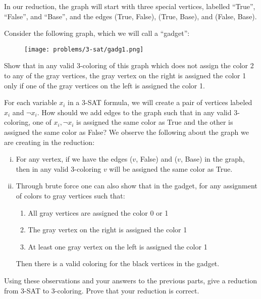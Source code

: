 \documentclass{article}
\begin{document}
In our reduction, the graph will start with three special vertices, labelled ``True'', ``False'', and ``Base'', and the edges (True, False), (True, Base), and (False, Base).
\begin{subparts}

\subpart Consider the following graph, which we will call a ``gadget'':

\begin{figure}[h] \centering
\texttt{[image: problems/3-sat/gadg1.png]}
\end{figure}

Show that in any valid 3-coloring of this graph which does not assign the color 2 to any of the gray vertices, the gray vertex on the right is assigned the color 1 only if one of the gray vertices on the left is assigned the color 1.

\subpart For each variable $x_i$ in a 3-SAT formula, we will create a
pair of vertices labeled $x_i$ and $\lnot x_i$. How should we add
edges to the graph such that in any valid 3-coloring, one of
$x_i, \lnot x_i$ is assigned the same color as True and the other is assigned the same color as False?
\subpart We observe the following about the graph we are creating in the reduction:
\begin{enumerate}[(i)]
\item For any vertex, if we have the edges ($v$, False) and ($v$, Base) in the graph, then in any valid 3-coloring $v$ will be assigned the same color as True.

\item Through brute force one can also show that in the gadget, for any assignment of colors to gray vertices such that:
\begin{enumerate}[(1)]
\item All gray vertices are assigned the color 0 or 1
\item The gray vertex on the right is assigned the color 1
\item At least one gray vertex on the left is assigned the color 1
\end{enumerate}
Then there is a valid coloring for the black vertices in the gadget.
\end{enumerate}

Using these observations and your answers to the previous parts, give
a reduction from 3-SAT to 3-coloring. Prove that your reduction is correct.

\end{subparts}
\end{document}
